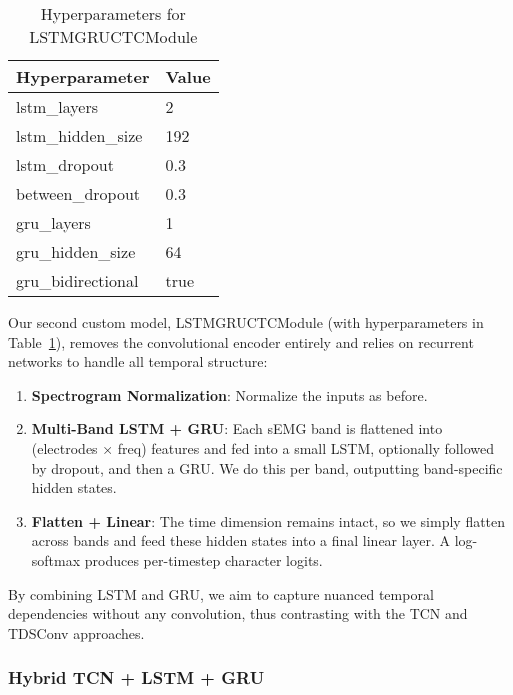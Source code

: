 \begin{table}
    \caption{Hyperparameters for LSTMGRUCTCModule}
    \label{tab:lstm_gru_ctc}
    \centering
    \begin{tabular}{ll}
      \toprule
      \textbf{Hyperparameter} & \textbf{Value} \\
      \midrule
      lstm\_layers & 2 \\
      lstm\_hidden\_size & 192 \\
      lstm\_dropout & 0.3 \\
      between\_dropout & 0.3 \\
      gru\_layers & 1 \\
      gru\_hidden\_size & 64 \\
      gru\_bidirectional & true \\
      \bottomrule
    \end{tabular}
    \label{tab:lstm_gru_hyperparameters}
\end{table}


Our second custom model, LSTMGRUCTCModule (with hyperparameters in Table~\ref{tab:lstm_gru_hyperparameters}), removes the convolutional encoder entirely and relies on recurrent networks to handle all temporal structure:
\begin{enumerate}
    \item\textbf{Spectrogram Normalization}: Normalize the inputs as before.

    \item \textbf{Multi-Band LSTM + GRU}: Each sEMG band is flattened into (electrodes × freq) features and fed into a small LSTM, optionally followed by dropout, and then a GRU. We do this per band, outputting band-specific hidden states.

    \item \textbf{Flatten + Linear}: The time dimension remains intact, so we simply flatten across bands and feed these hidden states into a final linear layer. A log-softmax produces per-timestep character logits.
\end{enumerate}

By combining LSTM and GRU, we aim to capture nuanced temporal dependencies without any convolution, thus contrasting with the TCN and TDSConv approaches.

\subsubsection{Hybrid TCN + LSTM + GRU}

